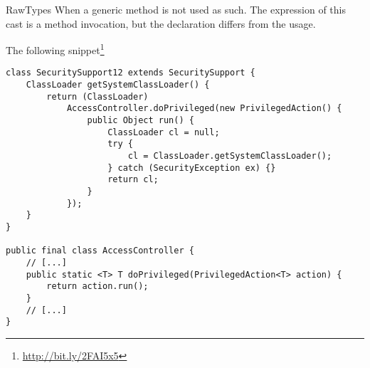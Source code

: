 \begin{pattern}{RawTypes}
When a generic method is not used as such.
The expression of this cast is a method invocation,
but the declaration differs from the usage.

\instances{}
The following snippet\footnote{\url{http://bit.ly/2FAI5x5}}

\begin{verbatim}
class SecuritySupport12 extends SecuritySupport {
    ClassLoader getSystemClassLoader() {
        return (ClassLoader)
            AccessController.doPrivileged(new PrivilegedAction() {
                public Object run() {
                    ClassLoader cl = null;
                    try {
                        cl = ClassLoader.getSystemClassLoader();
                    } catch (SecurityException ex) {}
                    return cl;
                }
            });
    }
}

public final class AccessController {
    // [...]
    public static <T> T doPrivileged(PrivilegedAction<T> action) {
        return action.run();
    }
    // [...]
}
\end{verbatim}

\detection{}

\discussion{}

\related{}

\end{pattern}